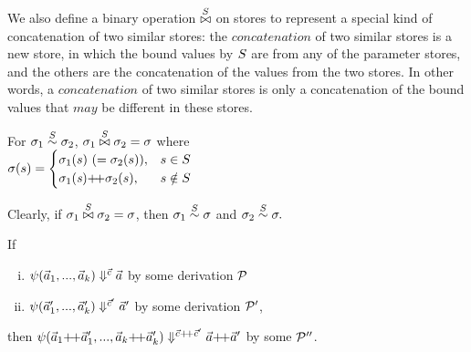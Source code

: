 We also define a binary operation $\x\S$ on stores to represent a special kind of concatenation of two similar stores: 
the $concatenation$ of two similar stores is a new store, in which the bound values by $\S$ are from any of the parameter stores, and 
the others are the concatenation of the values from the two stores. 
In other words, a $concatenation$ of two similar stores is only a concatenation of the bound values that $may$ be different in these stores.
\begin{defi} \label{def-sgm-join}
	For $\sgm_1 \~\S \sgm_2$,
	$\sgm_1 \x{\S} \sgm_2 = \sgm$ where \\
	$\sgm(s) =
	\begin{cases}
	\sgm_1(s) \ (=\sgm_2(s)), & s \in \S\\
	\sgm_1(\s) {\++} \sgm_2(s), & s \notin \S \\
	\end{cases} $
\end{defi}

Clearly, if $\sgm_1 \x{\S} \sgm_2 = \sgm$, 
	then $\sgm_1 \~{\S} \sgm$ and $\sgm_2 \~{\S} \sgm.$



\begin{lem} \label{lem-psi-join}
	If \begin{enumerate}[(i)]
	 \item $\sevalfg{\lcall}{\a_{1},...,\a_{k}}{\c}{\a}$ by some derivation $\MP$
	 \item $\sevalfg{\lcall}{\a'_{1},...,\a'_{k}}{\c'}{\a'}$ by some derivation $\MP'$,
	\end{enumerate}
	then $\sevalfg{\lcall}{\a_{1} {\++} \a'_{1},...,\a_{k} {\++} \a'_{k}}{\c {\++} \c'}{\a {\++} \a'}$ by some $\MP''$.
\end{lem}

